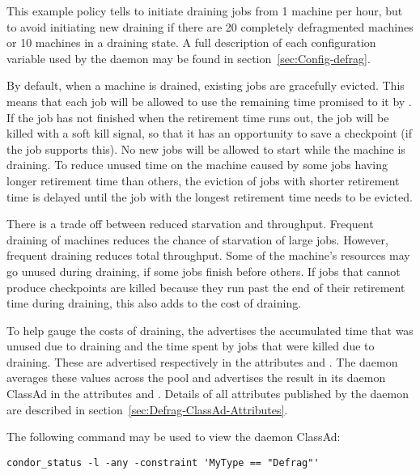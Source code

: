 This example policy tells  to initiate draining 
jobs from 1 machine per hour,
but to avoid initiating new draining if there are 
20 completely defragmented machines or 10 machines in a draining state.
A full description of each configuration variable
used by the  daemon may be found in 
section~\ref{sec:Config-defrag}.

By default, when a machine is drained, existing jobs are gracefully evicted.
This means that each job will be allowed to use the remaining
time promised to it by .  
If the job has not finished when the retirement time runs out, 
the job will be killed with a soft kill signal, 
so that it has an opportunity to save a checkpoint
(if the job supports this).
No new jobs will be allowed to start while the machine is draining.
To reduce unused time on the
machine caused by some jobs having longer retirement time than others,
the eviction of jobs with shorter retirement time is delayed until the
job with the longest retirement time needs to be evicted.

There is a trade off between reduced starvation and throughput.
Frequent draining of machines reduces the chance of starvation of
large jobs.  However, frequent draining reduces total throughput.
Some of the machine's resources may go unused during draining,
if some jobs finish before others.  
If jobs that cannot produce checkpoints are killed
because they run past the end of their retirement time during draining,
this also adds to the cost of draining.

To help gauge the costs of draining, the  advertises
the accumulated time that was unused due to draining and the time
spent by jobs that were killed due to draining.  
These are advertised
respectively in the attributes  and
.  
The  daemon
averages these values across the pool and advertises the result in its
daemon ClassAd in the attributes  and
.  
Details of all attributes published by
the  daemon are described in
section~\ref{sec:Defrag-ClassAd-Attributes}.

The following command may be used to view the  daemon
ClassAd:

\begin{verbatim}
condor_status -l -any -constraint 'MyType == "Defrag"'
\end{verbatim}

